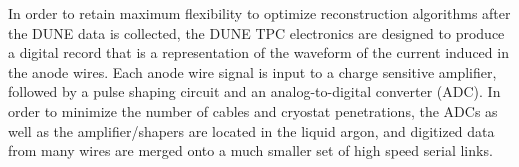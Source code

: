 In order to retain maximum flexibility to optimize reconstruction algorithms after the DUNE data is collected, the DUNE TPC electronics are designed to produce a digital record that is a representation of the waveform of the current induced in the anode wires.  Each anode wire signal is input to a charge sensitive amplifier, followed by a pulse shaping circuit and an analog-to-digital converter (ADC).  In order to minimize the number of cables and cryostat penetrations, the ADCs as well as the amplifier/shapers are located in the liquid argon, and digitized data from many wires are merged onto a much smaller set of high speed serial links.  %

